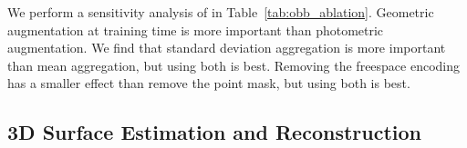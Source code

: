 
We perform a sensitivity analysis of \EFMmodel{} in Table~\ref{tab:obb_ablation}. Geometric augmentation at training time is more important than photometric augmentation. We find that standard deviation aggregation is more important than mean aggregation, but using both is best. Removing the freespace encoding has a smaller effect than remove the point mask, but using both is best. 














\subsection{3D Surface Estimation and Reconstruction}


